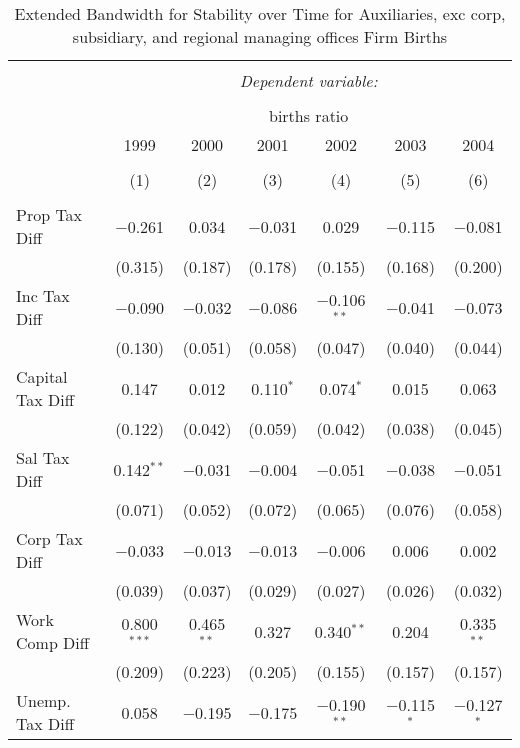 
\begin{table}[!htbp] \centering 
  \caption{Extended Bandwidth for Stability over Time for  Auxiliaries, exc corp, subsidiary, and regional managing offices Firm Births} 
  \label{95 ebyear} 
\small 
\begin{tabular}{@{\extracolsep{5pt}}lcccccc} 
\\[-1.8ex]\hline 
\hline \\[-1.8ex] 
 & \multicolumn{6}{c}{\textit{Dependent variable:}} \\ 
\cline{2-7} 
\\[-1.8ex] & \multicolumn{6}{c}{births ratio} \\ 
 & 1999 & 2000 & 2001 & 2002 & 2003 & 2004 \\ 
\\[-1.8ex] & (1) & (2) & (3) & (4) & (5) & (6)\\ 
\hline \\[-1.8ex] 
 Prop Tax Diff & $-$0.261 & 0.034 & $-$0.031 & 0.029 & $-$0.115 & $-$0.081 \\ 
  & (0.315) & (0.187) & (0.178) & (0.155) & (0.168) & (0.200) \\ 
  Inc Tax Diff & $-$0.090 & $-$0.032 & $-$0.086 & $-$0.106$^{**}$ & $-$0.041 & $-$0.073 \\ 
  & (0.130) & (0.051) & (0.058) & (0.047) & (0.040) & (0.044) \\ 
  Capital Tax Diff & 0.147 & 0.012 & 0.110$^{*}$ & 0.074$^{*}$ & 0.015 & 0.063 \\ 
  & (0.122) & (0.042) & (0.059) & (0.042) & (0.038) & (0.045) \\ 
  Sal Tax Diff & 0.142$^{**}$ & $-$0.031 & $-$0.004 & $-$0.051 & $-$0.038 & $-$0.051 \\ 
  & (0.071) & (0.052) & (0.072) & (0.065) & (0.076) & (0.058) \\ 
  Corp Tax Diff & $-$0.033 & $-$0.013 & $-$0.013 & $-$0.006 & 0.006 & 0.002 \\ 
  & (0.039) & (0.037) & (0.029) & (0.027) & (0.026) & (0.032) \\ 
  Work Comp Diff & 0.800$^{***}$ & 0.465$^{**}$ & 0.327 & 0.340$^{**}$ & 0.204 & 0.335$^{**}$ \\ 
  & (0.209) & (0.223) & (0.205) & (0.155) & (0.157) & (0.157) \\ 
  Unemp. Tax Diff & 0.058 & $-$0.195 & $-$0.175 & $-$0.190$^{**}$ & $-$0.115$^{*}$ & $-$0.127$^{*}$ \\ 

\end{tabular}
\end{table}
